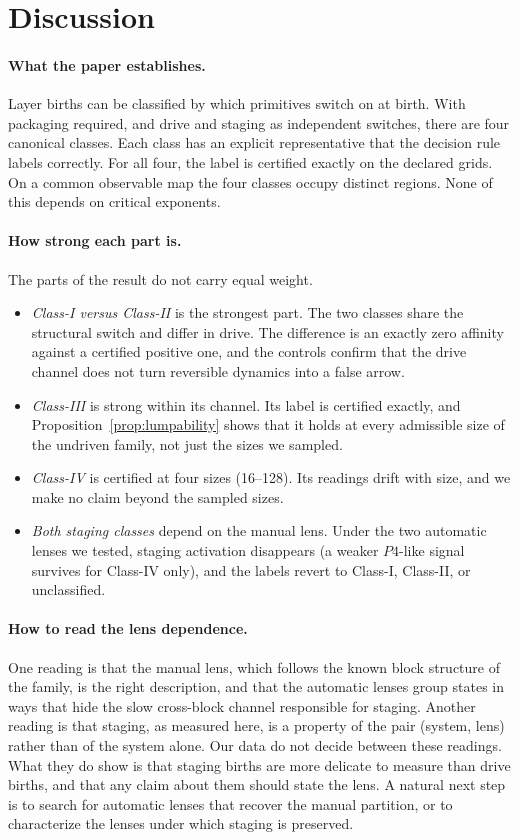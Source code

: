 \section{Discussion}
\label{sec:discussion}

\paragraph{What the paper establishes.} Layer births can be classified by which primitives switch on at birth. With packaging required, and drive and staging as independent switches, there are four canonical classes. Each class has an explicit representative that the decision rule labels correctly. For all four, the label is certified exactly on the declared grids. On a common observable map the four classes occupy distinct regions. None of this depends on critical exponents.

\paragraph{How strong each part is.} The parts of the result do not carry equal weight.
\begin{itemize}
  \item \emph{Class-I versus Class-II} is the strongest part. The two classes share the structural switch and differ in drive. The difference is an exactly zero affinity against a certified positive one, and the controls confirm that the drive channel does not turn reversible dynamics into a false arrow.
  \item \emph{Class-III} is strong within its channel. Its label is certified exactly, and Proposition~\ref{prop:lumpability} shows that it holds at every admissible size of the undriven family, not just the sizes we sampled.
  \item \emph{Class-IV} is certified at four sizes (16--128). Its readings drift with size, and we make no claim beyond the sampled sizes.
  \item \emph{Both staging classes} depend on the manual lens. Under the two automatic lenses we tested, staging activation disappears (a weaker $P4$-like signal survives for Class-IV only), and the labels revert to Class-I, Class-II, or unclassified.
\end{itemize}

\paragraph{How to read the lens dependence.} One reading is that the manual lens, which follows the known block structure of the family, is the right description, and that the automatic lenses group states in ways that hide the slow cross-block channel responsible for staging. Another reading is that staging, as measured here, is a property of the pair (system, lens) rather than of the system alone. Our data do not decide between these readings. What they do show is that staging births are more delicate to measure than drive births, and that any claim about them should state the lens. A natural next step is to search for automatic lenses that recover the manual partition, or to characterize the lenses under which staging is preserved.

